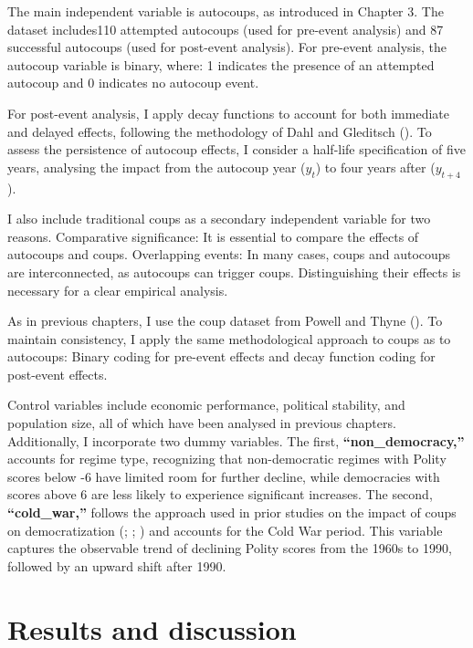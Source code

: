 \documentclass[
  12pt,
]{report}
\begin{document}
The main independent variable is autocoups, as introduced in Chapter 3.
The dataset includes110 attempted autocoups (used for pre-event
analysis) and 87 successful autocoups (used for post-event analysis).
For pre-event analysis, the autocoup variable is binary, where: 1
indicates the presence of an attempted autocoup and 0 indicates no
autocoup event.

For post-event analysis, I apply decay functions to account for both
immediate and delayed effects, following the methodology of Dahl and
Gleditsch (). To assess the persistence of
autocoup effects, I consider a half-life specification of five years,
analysing the impact from the autocoup year (\(y_t\)) to four years
after (\(y_{t+4}\)).

I also include traditional coups as a secondary independent variable for
two reasons. Comparative significance: It is essential to compare the
effects of autocoups and coups. Overlapping events: In many cases, coups
and autocoups are interconnected, as autocoups can trigger coups.
Distinguishing their effects is necessary for a clear empirical
analysis.

As in previous chapters, I use the coup dataset from Powell and Thyne
(). To maintain consistency, I apply the
same methodological approach to coups as to autocoups: Binary coding for
pre-event effects and decay function coding for post-event effects.

Control variables include economic performance, political stability, and
population size, all of which have been analysed in previous chapters.
Additionally, I incorporate two dummy variables. The first,
\textbf{``\textbf{non\_democracy},''} accounts for regime type,
recognizing that non-democratic regimes with Polity scores below -6 have
limited room for further decline, while democracies with scores above 6
are less likely to experience significant increases. The second,
\textbf{``\textbf{cold\_war},''} follows the approach used in prior
studies on the impact of coups on democratization
(;
;
) and accounts for the
Cold War period. This variable captures the observable trend of
declining Polity scores from the 1960s to 1990, followed by an upward
shift after 1990.

\section{Results and discussion}\label{results-and-discussion-1}
\end{document}
